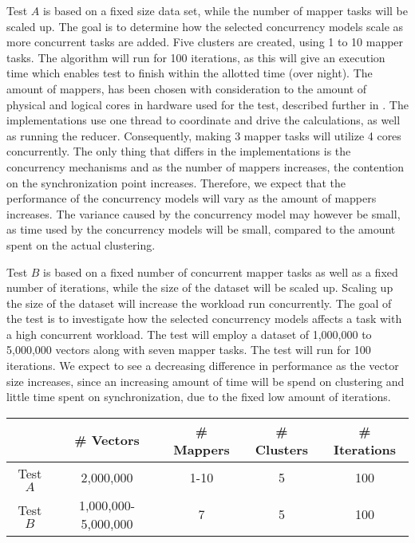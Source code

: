 Test $A$ is based on a fixed size data set, while the number of mapper tasks will be scaled up. The goal is to determine how the selected concurrency models scale as more concurrent tasks are added. Five clusters are created, using 1 to 10 mapper tasks. The algorithm will run for 100 iterations, as this will give an execution time which enables test to finish within the allotted time (over night). The amount of mappers, has been chosen with consideration to the amount of physical and logical cores in hardware used for the test, described further in . The implementations use one thread to coordinate and drive the calculations, as well as running the reducer. Consequently, making 3 mapper tasks will utilize 4 cores concurrently. The only thing that differs in the implementations is the concurrency mechanisms and as the number of mappers increases, the contention on the synchronization point increases. Therefore, we expect that the performance of the concurrency models will vary as the amount of mappers increases. The variance caused by the concurrency model may however be small, as time used by the concurrency models will be small, compared to the amount spent on the actual clustering. 

Test $B$ is based on a fixed number of concurrent mapper tasks as well as a fixed number of iterations, while the size of the dataset will be scaled up. Scaling up the size of the dataset will increase the workload run concurrently. The goal of the test is to investigate how the selected concurrency models affects a task with a high concurrent workload. The test will employ a dataset of 1,000,000 to 5,000,000 vectors along with seven mapper tasks. The test will run for 100 iterations. We expect to see a decreasing difference in performance as the vector size increases, since an increasing amount of time will be spend on clustering and little time spent on synchronization, due to the fixed low amount of iterations.

\begin{center}
\begin{table}[h]
\centering
\begin{tabular}{c|cccc}
       & \# Vectors        & \# Mappers			 	& \# Clusters & \# Iterations \\ \hline
Test $A$ & 2,000,000            & 1-10        			& 5           & 100      \\
Test $B$ & 1,000,000-5,000,000  & 7          			& 5           & 100
\end{tabular}
\end{table}
 \label{tab:test_description_work_intensive} 
\end{center}

